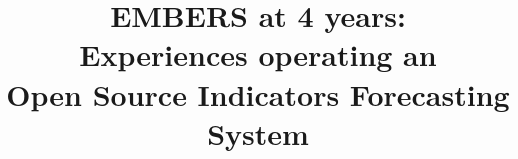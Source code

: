 \documentclass{sig-alternate-05-2015}
\begin{document}





\makeatletter
\let\@copyrightspace\relax
\makeatother


%

\title{EMBERS at 4 years:\\
Experiences operating an \\
Open Source Indicators Forecasting System}
%
%
%
%
%
\end{document}

